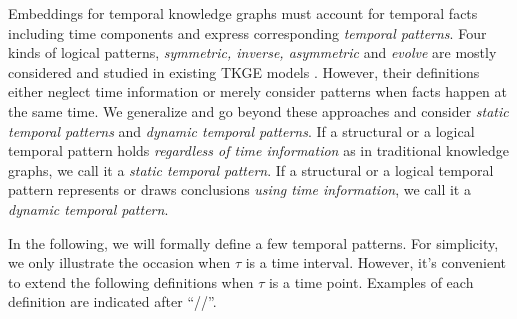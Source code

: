 \documentclass[letterpaper]{article} %
\begin{document}
Embeddings for temporal knowledge graphs must account for temporal facts including time components and express corresponding \emph{temporal patterns}.
Four kinds of logical patterns, \emph{symmetric, inverse, asymmetric} and \emph{evolve} are mostly considered and studied in existing TKGE models \cite{chen2022rotateqvs,xu2020tero}.
However, their definitions either neglect time information or merely consider patterns when facts happen at the same time.
We generalize and go beyond these approaches and consider \emph{static temporal patterns} and \emph{dynamic temporal patterns}. If a structural or a logical temporal pattern holds \emph{regardless of time information} as in traditional knowledge graphs, we call it a \emph{static temporal pattern}.
If a structural or a logical temporal pattern represents or draws conclusions \emph{using time information}, we call it a \emph{dynamic temporal pattern}.

In the following, we will formally define a few temporal patterns. For simplicity, we only illustrate the occasion when $\tau$ is a time interval. However, it's convenient to extend the following definitions when $\tau$ is a time point. Examples of each definition are indicated after ``//''.
\end{document}
